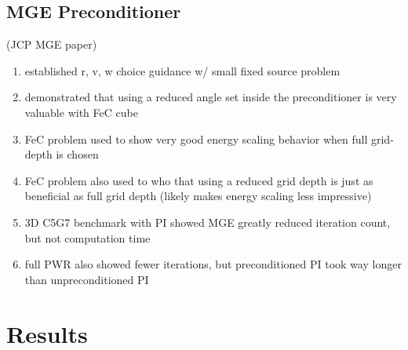\documentclass[preprint,12pt]{elsarticle}
\begin{document}
\subsection{MGE Preconditioner}
(JCP MGE paper)
\begin{enumerate}
 \item established r, v, w choice guidance w/ small fixed source problem
 \item demonstrated that using a reduced angle set inside the preconditioner is very valuable with FeC cube
 \item FeC problem used to show very good energy scaling behavior when full grid-depth is chosen 
 \item FeC problem also used to who that using a reduced grid depth is just as beneficial as full grid depth (likely makes energy scaling less impressive)
 \item 3D C5G7 benchmark with PI showed MGE greatly reduced iteration count, but not computation time
 \item full PWR also showed fewer iterations, but preconditioned PI took way longer than unpreconditioned PI
\end{enumerate}


\section{Results}


\end{document}
